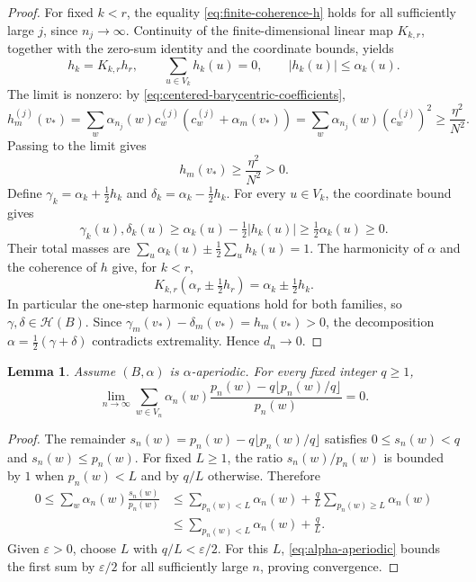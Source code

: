 \documentclass[11pt]{amsart}
\newtheorem{lemma}[theorem]{Lemma}
\theoremstyle{definition}
\theoremstyle{remark}
\begin{document}
\begin{proof}
For fixed $k<r$, the equality \eqref{eq:finite-coherence-h} holds for all
sufficiently large $j$, since $n_j\to\infty$.
Continuity of the finite-dimensional linear map $K_{k,r}$,
together with the zero-sum identity and the coordinate bounds, yields
\begin{equation}\label{eq:coherent-tangent-vector}
 h_k=K_{k,r}h_r,\qquad
 \sum_{u\in V_k}h_k(u)=0,\qquad |h_k(u)|\leq\alpha_k(u).
\end{equation}
The limit is nonzero: by \eqref{eq:centered-barycentric-coefficients},
\[
 h_m^{(j)}(v_*)
 =\sum_w\alpha_{n_j}(w)c_w^{(j)}
       (c_w^{(j)}+\alpha_m(v_*))
 =\sum_w\alpha_{n_j}(w)(c_w^{(j)})^2
 \geq\frac{\eta^2}{N^2}.
\]
Passing to the limit gives
\[
 h_m(v_*)\geq\frac{\eta^2}{N^2}>0.
\]
Define $\gamma_k=\alpha_k+\tfrac12h_k$ and
$\delta_k=\alpha_k-\tfrac12h_k$.
For every $u\in V_k$, the coordinate bound gives
\[
 \gamma_k(u),\delta_k(u)
 \geq\alpha_k(u)-\tfrac12|h_k(u)|\geq\tfrac12\alpha_k(u)\geq0.
\]
Their total masses are
$\sum_u\alpha_k(u)\pm\tfrac12\sum_u h_k(u)=1$.
The harmonicity of $\alpha$ and the coherence of $h$ give, for $k<r$,
\[
 K_{k,r}(\alpha_r\pm\tfrac12h_r)
 =\alpha_k\pm\tfrac12h_k.
\]
In particular the one-step harmonic equations hold for both families,
so $\gamma,\delta\in\mathcal H(B)$.
Since $\gamma_m(v_*)-\delta_m(v_*)=h_m(v_*)>0$, the decomposition
$\alpha=\tfrac12(\gamma+\delta)$ contradicts extremality.
Hence $d_n\to0$.
\end{proof}

\begin{lemma}\label{lem:tall}
Assume $(B,\alpha)$ is $\alpha$-aperiodic.
For every fixed integer $q\geq1$,
\[
 \lim_{n\to\infty}
 \sum_{w\in V_n}\alpha_n(w)
 \frac{p_n(w)-q\lfloor p_n(w)/q\rfloor}{p_n(w)}=0.
\]
\end{lemma}

\begin{proof}
The remainder $s_n(w)=p_n(w)-q\lfloor p_n(w)/q\rfloor$ satisfies
$0\leq s_n(w)<q$ and $s_n(w)\leq p_n(w)$.
For fixed $L\geq1$, the ratio $s_n(w)/p_n(w)$ is bounded by $1$
when $p_n(w)<L$ and by $q/L$ otherwise.  Therefore
\[
 \begin{aligned}
 0\leq\sum_w\alpha_n(w)\frac{s_n(w)}{p_n(w)}
 &\leq\sum_{p_n(w)<L}\alpha_n(w)
   +\frac qL\sum_{p_n(w)\geq L}\alpha_n(w)\\
 &\leq\sum_{p_n(w)<L}\alpha_n(w)+\frac qL.
 \end{aligned}
\]
Given $\varepsilon>0$, choose $L$ with $q/L<\varepsilon/2$.
For this $L$, \eqref{eq:alpha-aperiodic} bounds the first sum by
$\varepsilon/2$ for all sufficiently large $n$, proving convergence.
\end{proof}
\end{document}
